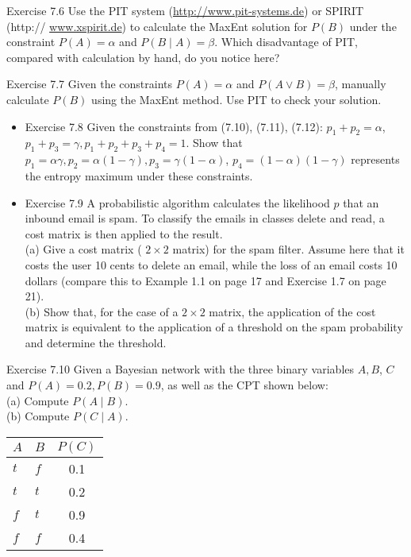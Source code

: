 \documentclass[10pt]{article}
\begin{document}
Exercise 7.6 Use the PIT system (\href{http://www.pit-systems.de}{http://www.pit-systems.de}) or SPIRIT (http:// \href{http://www.xspirit.de}{www.xspirit.de}) to calculate the MaxEnt solution for $P(B)$ under the constraint $P(A)=\alpha$ and $P(B \mid A)=\beta$. Which disadvantage of PIT, compared with calculation by hand, do you notice here?

Exercise 7.7 Given the constraints $P(A)=\alpha$ and $P(A \vee B)=\beta$, manually calculate $P(B)$ using the MaxEnt method. Use PIT to check your solution.

\begin{itemize}
  \item Exercise 7.8 Given the constraints from (7.10), (7.11), (7.12): $p_{1}+p_{2}=\alpha$, $p_{1}+p_{3}=\gamma, p_{1}+p_{2}+p_{3}+p_{4}=1$. Show that $p_{1}=\alpha \gamma, p_{2}=\alpha(1-\gamma), p_{3}=\gamma(1-\alpha)$, $p_{4}=(1-\alpha)(1-\gamma)$ represents the entropy maximum under these constraints.
  \item Exercise 7.9 A probabilistic algorithm calculates the likelihood $p$ that an inbound email is spam. To classify the emails in classes delete and read, a cost matrix is then applied to the result.\\
(a) Give a cost matrix ( $2 \times 2$ matrix) for the spam filter. Assume here that it costs the user 10 cents to delete an email, while the loss of an email costs 10 dollars (compare this to Example 1.1 on page 17 and Exercise 1.7 on page 21).\\
(b) Show that, for the case of a $2 \times 2$ matrix, the application of the cost matrix is equivalent to the application of a threshold on the spam probability and determine the threshold.
\end{itemize}

Exercise 7.10 Given a Bayesian network with the three binary variables $A, B$, $C$ and $P(A)=0.2, P(B)=0.9$, as well as the CPT shown below:\\
(a) Compute $P(A \mid B)$.\\
(b) Compute $P(C \mid A)$.

\begin{center}
\begin{tabular}{llc}
\hline
$A$ & $B$ & $P(C)$ \\
\hline
$t$ & $f$ & 0.1 \\
\hline
$t$ & $t$ & 0.2 \\
\hline
$f$ & $t$ & 0.9 \\
\hline
$f$ & $f$ & 0.4 \\
\hline
\end{tabular}
\end{center}
\end{document}
